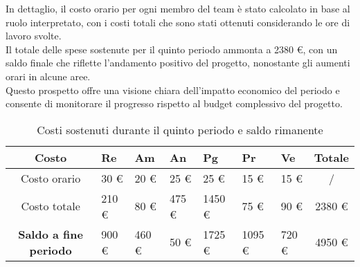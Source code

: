 In dettaglio, il costo orario per ogni membro del team è stato calcolato in base al ruolo interpretato, con i costi totali che sono stati ottenuti considerando le ore di lavoro svolte.\\
Il totale delle spese sostenute per il quinto periodo ammonta a 2380 \euro, con un saldo finale che riflette l'andamento positivo del progetto, nonostante gli aumenti orari in alcune aree.\\
Questo prospetto offre una visione chiara dell'impatto economico del periodo e consente di monitorare il progresso rispetto al budget complessivo del progetto.
\begin{table}[!h]
    \centering
    \renewcommand{\arraystretch}{1.5}
    \begin{tabularx}{\textwidth}{|c|X|X|X|X|X|X|c|}\hline
    \rowcolor[HTML]{FFD700} 
    \textbf{Costo} & \textbf{Re} & \textbf{Am} & \textbf{An} & \textbf{Pg} & \textbf{Pr} & \textbf{Ve} & \textbf{Totale} \\ \hline
    Costo orario & 30 \euro & 20 \euro & 25 \euro & 25 \euro & 15 \euro & 15 \euro & /  \\ \hline
    Costo totale & 210 \euro & 80 \euro & 475 \euro & 1450 \euro & 75 \euro & 90 \euro & 2380 \euro \\ \hline
    \rowcolor[HTML]{FFD700} 
    \textbf{Saldo a fine periodo}  & 900 \euro & 460 \euro & 50 \euro & 1725 \euro & 1095 \euro & 720 \euro & 4950 \euro \\ \hline
    \end{tabularx}
    \caption{Costi sostenuti durante il quinto periodo e saldo rimanente}
\end{table}


